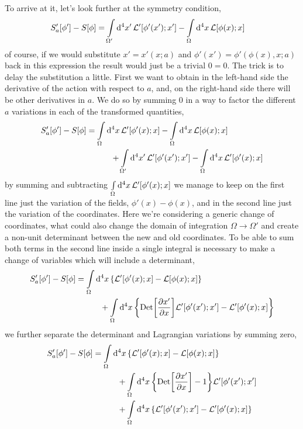 To arrive at it, let's look further at the symmetry condition,
\begin{align}
    S_a'\qty[\phi']-S\qty[\phi] &= \int\limits_{\Omega'}\dd[4]{x'}\mathcal L'\qty[\phi'\qty(x');x']-\int\limits_{\Omega}\dd[4]{x}\mathcal L\qty[\phi\qty(x);x]
\end{align}
of course, if we would substitute $x'=x'(x;a)$ and $\phi'(x')=\phi'(\phi(x),x;a)$ back in this expression the result would just be a trivial $0=0$. 
The trick is to delay the substitution a little. First we want to obtain in the left-hand side the derivative of the 
action with respect to $a$, and, on the right-hand side there will be other derivatives in $a$. We do so by summing 
$0$ in a way to factor the different $a$ variations in each of the transformed quantities,
\begin{align}
    S_a'\qty[\phi']-S\qty[\phi] &= \int\limits_{\Omega}\dd[4]{x}\mathcal L'\qty[\phi'\qty(x);x]-\int\limits_{\Omega}\dd[4]{x}\mathcal L\qty[\phi\qty(x);x]\nonumber\\
    &\quad\quad\quad+\int\limits_{\Omega'}\dd[4]{x'}\mathcal L'\qty[\phi'\qty(x');x']-\int\limits_{\Omega}\dd[4]{x}\mathcal L'\qty[\phi'\qty(x);x]
\end{align}
by summing and subtracting $\int\limits_\Omega \dd[4]{x}\mathcal L'\qty[\phi'(x);x]$ we manage to keep on the first line just the 
variation of the fields, $\phi'(x)-\phi(x)$, and in the second line just the variation of the coordinates. Here we're 
considering a generic change of coordinates, what could also change the domain of integration $\Omega\rightarrow\Omega'$ and 
create a non-unit determinant between the new and old coordinates. To be able to sum both terms in the second line inside a 
single integral is necessary to make a change of variables which will include a determinant,
\begin{align}
    S_a'\qty[\phi']-S\qty[\phi] &= \int\limits_{\Omega}\dd[4]{x}\qty{\mathcal L'\qty[\phi'\qty(x);x]-\mathcal L\qty[\phi\qty(x);x]}\nonumber\\
    &\quad\quad\quad+\int\limits_{\Omega}\dd[4]{x}\qty{\textup{Det} \qty[\pdv{x'}{x}]\mathcal L'\qty[\phi'\qty(x');x']-\mathcal L'\qty[\phi'\qty(x);x]}
\end{align}
we further separate the determinant and Lagrangian variations by summing zero,
\begin{align}
    S_a'\qty[\phi']-S\qty[\phi] &= \int\limits_{\Omega}\dd[4]{x}\qty{\mathcal L'\qty[\phi'\qty(x);x]-\mathcal L\qty[\phi\qty(x);x]}\nonumber\\
    &\quad\quad\quad+\int\limits_{\Omega}\dd[4]{x}\qty{\textup{Det} \qty[\pdv{x'}{x}]-1}\mathcal L'\qty[\phi'\qty(x');x']\nonumber\\
    &\quad\quad\quad+\int\limits_{\Omega}\dd[4]{x}\qty{\mathcal L'\qty[\phi'\qty(x');x']-\mathcal L'\qty[\phi'\qty(x);x]}
\end{align}

